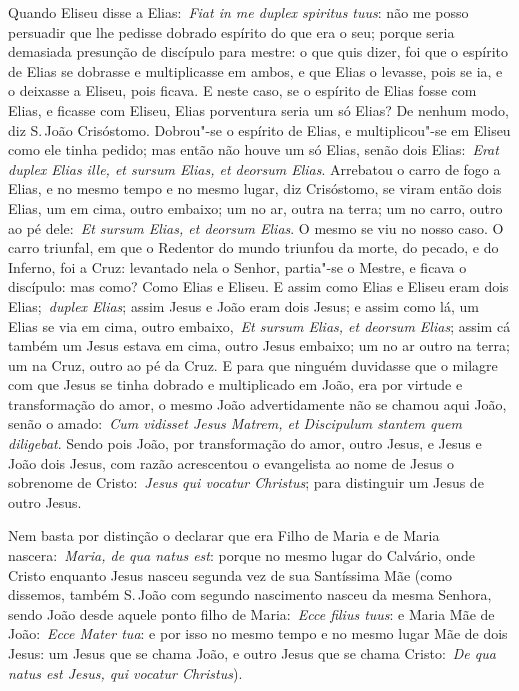 Quando Eliseu disse a Elias:~\emph{Fiat in me duplex
spiritus tuus}: não me posso persuadir que lhe pedisse
dobrado espírito do que era o seu; porque seria demasiada presunção de
discípulo para mestre: o que quis dizer, foi que o espírito de Elias se
dobrasse e multiplicasse em ambos, e que Elias o levasse, pois se ia, e
o deixasse a Eliseu, pois ficava. E neste caso, se o espírito de Elias
fosse com Elias, e ficasse com Eliseu, Elias porventura seria um só
Elias? De nenhum modo, diz S.\,João Crisóstomo. Dobrou"-se o espírito de
Elias, e multiplicou"-se em Eliseu como ele tinha pedido; mas então não
houve um só Elias, senão dois Elias:~\emph{Erat duplex Elias ille, et
sursum Elias, et deorsum Elias}. Arrebatou o carro de fogo a Elias, e no
mesmo tempo e no mesmo lugar, diz Crisóstomo, se viram então dois Elias,
um em cima, outro embaixo; um no ar, outra na terra; um no carro, outro
ao pé dele:~\emph{Et sursum Elias, et deorsum Elias}. O mesmo se viu no
nosso caso. O carro triunfal, em que o Redentor do mundo triunfou da
morte, do pecado, e do Inferno, foi a Cruz: levantado nela o Senhor,
partia"-se o Mestre, e ficava o discípulo: mas como? Como Elias e Eliseu.
E assim como Elias e Eliseu eram dois Elias;~\emph{duplex Elias}; assim
Jesus e João eram dois Jesus; e assim como lá, um Elias se via em cima,
outro embaixo,~\emph{Et sursum Elias, et deorsum Elias}; assim cá também
um Jesus estava em cima, outro Jesus embaixo; um no ar outro na terra;
um na Cruz, outro ao pé da Cruz. E para que ninguém duvidasse que o
milagre com que Jesus se tinha dobrado e multiplicado em João, era por
virtude e transformação do amor, o mesmo João advertidamente não se
chamou aqui João, senão o amado:~\emph{Cum vidisset Jesus Matrem, et
Discipulum stantem quem diligebat}. Sendo pois João,
por transformação do amor, outro Jesus, e Jesus e João dois Jesus, com
razão acrescentou o evangelista ao nome de Jesus o sobrenome de
Cristo:~\emph{Jesus qui vocatur Christus}; para distinguir um Jesus de
outro Jesus.

Nem basta por distinção o declarar que era Filho de Maria e
de Maria nascera:~\emph{Maria, de qua natus est}: porque no mesmo lugar
do Calvário, onde Cristo enquanto Jesus nasceu segunda vez de sua
Santíssima Mãe (como dissemos, também S.\,João com segundo nascimento
nasceu da mesma Senhora, sendo João desde aquele ponto filho de
Maria:~\emph{Ecce filius tuus}: e Maria Mãe de João:~\emph{Ecce Mater
tua}: e por isso no mesmo tempo e no mesmo lugar Mãe de dois Jesus: um
Jesus que se chama João, e outro Jesus que se chama Cristo:~\emph{De qua
natus est Jesus, qui vocatur Christus}).

